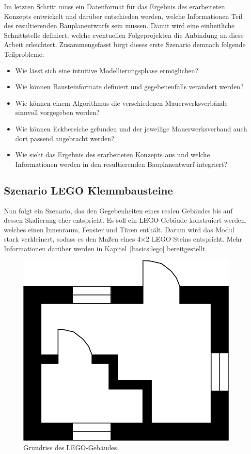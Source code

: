 Im letzten Schritt muss ein Datenformat für das Ergebnis des erarbeiteten Konzepts entwickelt und darüber entschieden werden, welche Informationen Teil des resultierenden Bauplanentwurfs sein müssen.
Damit wird eine einheitliche Schnittstelle definiert, welche eventuellen Folgeprojekten die Anbindung an diese Arbeit erleichtert.
Zusammengefasst birgt dieses erste Szenario demnach folgende Teilprobleme:
\begin{itemize}
  \item Wie lässt sich eine intuitive Modellierungsphase ermöglichen?
  \item Wie können Bausteinformate definiert und gegebenenfalls verändert werden?
  \item Wie können einem Algorithmus die verschiedenen Mauerwerksverbände sinnvoll vorgegeben werden?
  \item Wie können Eckbereiche gefunden und der jeweilige Mauerwerksverband auch dort passend angebracht werden?
  \item Wie sieht das Ergebnis des erarbeiteten Konzepts aus und welche Informationen werden in den resultierenden Bauplanentwurf integriert?
\end{itemize}

\subsection{Szenario LEGO Klemmbausteine}\label{scenarios:scenario2}
Nun folgt ein Szenario, das den Gegebenheiten eines realen Gebäudes bis auf dessen Skalierung eher entspricht.
Es soll ein LEGO-Gebäude konstruiert werden, welches einen Innenraum, Fenster und Türen enthält.
Darum wird das Modul stark verkleinert, sodass es den Maßen eines 4$\times$2 LEGO Steins entspricht.
Mehr Informationen darüber werden in Kapitel~\ref{basics:lego} bereitgestellt.

\begin{figure}[ht]
  \centering
  \includegraphics[width=0.5\columnwidth]{fig/scenario2_storey_plan.png}
  \caption{Grundriss des LEGO-Gebäudes.}\label{fig:scenarios:Scenario2 Gebaeudeplan}
\end{figure}


